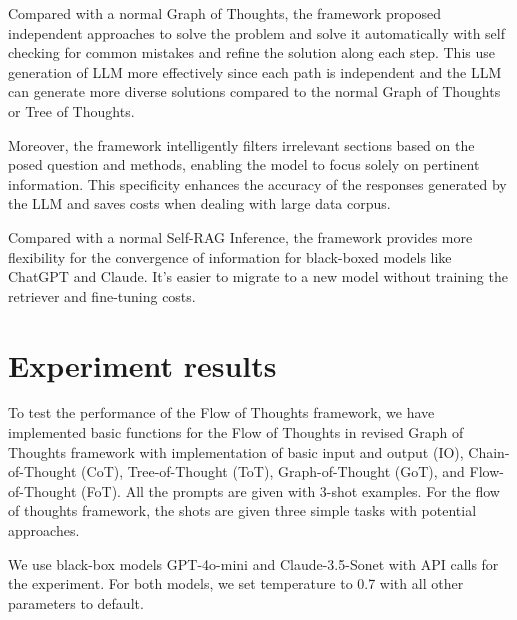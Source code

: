\documentclass{article}
\begin{document}
Compared with a normal Graph of Thoughts, the framework proposed independent approaches to solve the problem and solve it automatically with self checking for common mistakes and refine the solution along each step. This use generation of LLM more effectively since each path is independent and the LLM can generate more diverse solutions compared to the normal Graph of Thoughts or Tree of Thoughts.

Moreover, the framework intelligently filters irrelevant sections based on the posed question and methods, enabling the model to focus solely on pertinent information. This specificity enhances the accuracy of the responses generated by the LLM and saves costs when dealing with large data corpus.

Compared with a normal Self-RAG Inference, the framework provides more flexibility for the convergence of information for black-boxed models like ChatGPT and Claude. It's easier to migrate to a new model without training the retriever and fine-tuning costs.

\section{Experiment results}

To test the performance of the Flow of Thoughts framework, we have implemented basic functions for the Flow of Thoughts in revised Graph of Thoughts framework with implementation of basic input and output (IO), Chain-of-Thought (CoT), Tree-of-Thought (ToT), Graph-of-Thought (GoT), and Flow-of-Thought (FoT). All the prompts are given with 3-shot examples. For the flow of thoughts framework, the shots are given three simple tasks with potential approaches.

We use black-box models GPT-4o-mini and Claude-3.5-Sonet with API calls for the experiment. For both models, we set temperature to 0.7 with all other parameters to default.
\end{document}

